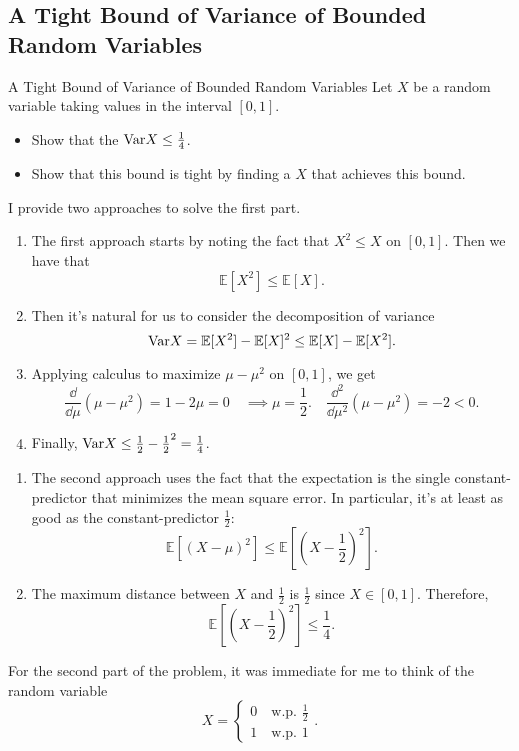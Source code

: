 \documentclass[../main]{subfiles}
\begin{document}
\subsection{A Tight Bound of Variance of Bounded Random Variables}
\begin{bbox}{A Tight Bound of Variance of Bounded Random Variables}
Let $X$ be a random variable taking values in the interval $[0,1]$. 
    \begin{itemize}
    \item Show that the $\text{Var} X \leq \frac{1}{4}$.
    \item Show that this bound is tight by finding a $X$ that achieves this bound.
\end{itemize}
\end{bbox}
\begin{solution}
    I provide two approaches to solve the first part. 
    \begin{enumerate}
        \item The first approach starts by noting the fact that $X^2 \leq X$ on $[0,1]$. Then we have that 
        \[
        \mathbb E [X^2] \leq \mathbb E [X].
        \]
        \item Then it's natural for us to consider the decomposition of variance 
        \[
        \text{Var} X = \mathbb E [X^2] - \mathbb E[X]^2 \leq \mathbb E[X] - \mathbb E [X^2]. 
        \]
        \item Applying calculus to maximize $\mu - \mu^2$ on $[0,1]$, we get 
        \[
        \frac{\dd}{\dd \mu} (\mu - \mu^2) = 1-2\mu = 0 \quad \implies \mu = \frac{1}{2}. \quad \frac{\dd^2}{\dd\mu^2}(\mu-\mu^2) = -2 < 0.
        \]
        \item Finally, $\text{Var} X \leq \frac{1}{2} - \frac{1}{2}^2 = \frac{1}{4}$. 
    \end{enumerate}
    \begin{enumerate}
        \item The second approach uses the fact that the expectation is the single constant-predictor that minimizes the mean square error. In particular, it's at least as good as the constant-predictor $\frac{1}{2}$:
        \[
        \mathbb E \left[(X-\mu)^2\right] \leq \mathbb E\left[(X-\frac{1}{2})^2\right].
        \]
        \item The maximum distance between $X$ and $\frac{1}{2}$ is $\frac{1}{2}$ since $X\in [0,1]$. Therefore,
        \[
        \mathbb E\left[(X-\frac{1}{2})^2\right] \leq \frac{1}{4}.
        \]
    \end{enumerate}
    For the second part of the problem, it was immediate for me to think of the random variable 
    \[
    X = \begin{cases}
        0 \quad \text{w.p. $\frac{1}{2}$} \\
        1 \quad \text{w.p. $1$} 
    \end{cases}.
    \]
    
    
\end{solution}
\end{document}
